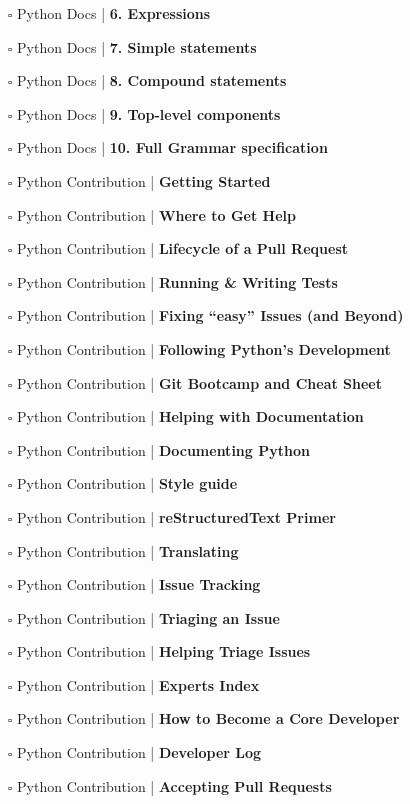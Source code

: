 \documentclass[a4, landscape, 12pt]{article}
\newcommand{\checkbox}{$\square$}%
\begin{document}
\begin{itemize}
{}
\item [\checkbox]  Python Docs | \textbf{ 6. Expressions
}
\item [\checkbox]  Python Docs | \textbf{ 7. Simple statements
}
\item [\checkbox]  Python Docs | \textbf{ 8. Compound statements
}
\item [\checkbox]  Python Docs | \textbf{ 9. Top-level components
}
\item [\checkbox]  Python Docs | \textbf{ 10. Full Grammar specification
}
\item [\checkbox]  Python Contribution | \textbf{ Getting Started
}
\item [\checkbox]  Python Contribution | \textbf{ Where to Get Help
}
\item [\checkbox]  Python Contribution | \textbf{ Lifecycle of a Pull Request
}
\item [\checkbox]  Python Contribution | \textbf{ Running & Writing Tests
}
\item [\checkbox]  Python Contribution | \textbf{ Fixing “easy” Issues (and Beyond)
}
\item [\checkbox]  Python Contribution | \textbf{ Following Python’s Development
}
\item [\checkbox]  Python Contribution | \textbf{ Git Bootcamp and Cheat Sheet
}
\item [\checkbox]  Python Contribution | \textbf{ Helping with Documentation
}
\item [\checkbox]  Python Contribution | \textbf{ Documenting Python
}
\item [\checkbox]  Python Contribution | \textbf{ Style guide
}
\item [\checkbox]  Python Contribution | \textbf{ reStructuredText Primer
}
\item [\checkbox]  Python Contribution | \textbf{ Translating
}
\item [\checkbox]  Python Contribution | \textbf{ Issue Tracking
}
\item [\checkbox]  Python Contribution | \textbf{ Triaging an Issue
}
\item [\checkbox]  Python Contribution | \textbf{ Helping Triage Issues
}
\item [\checkbox]  Python Contribution | \textbf{ Experts Index
}
\item [\checkbox]  Python Contribution | \textbf{ How to Become a Core Developer
}
\item [\checkbox]  Python Contribution | \textbf{ Developer Log
}
\item [\checkbox]  Python Contribution | \textbf{ Accepting Pull Requests
}
\end{itemize}
\end{document}
